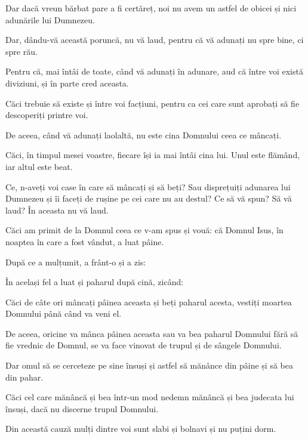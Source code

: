 {Dar dacă vreun bărbat pare a fi certăreț, noi nu avem un astfel de obicei și nici adunările lui Dumnezeu.


\par }{\PP {}Dar, dându-vă această poruncă, nu vă laud, pentru că vă adunați nu spre bine, ci spre rău.

Pentru că, mai întâi de toate, când vă adunați în adunare, aud că între voi există diviziuni, și în parte cred aceasta.

Căci trebuie să existe și între voi facțiuni, pentru ca cei care sunt aprobați să fie descoperiți printre voi.

De aceea, când vă adunați laolaltă, nu este cina Domnului ceea ce mâncați.

Căci, în timpul mesei voastre, fiecare își ia mai întâi cina lui. Unul este flămând, iar altul este beat.

Ce, n-aveți voi case în care să mâncați și să beți? Sau disprețuiți adunarea lui Dumnezeu și îi faceți de rușine pe cei care nu au destul? Ce să vă spun? Să vă laud? În aceasta nu vă laud.


\par }{\PP {}Căci am primit de la Domnul ceea ce v-am spus și vouă: că Domnul Isus, în noaptea în care a fost vândut, a luat pâine.

După ce a mulțumit, a frânt-o și a zis:
{}

În același fel a luat și paharul după cină, zicând:
{}

Căci de câte ori mâncați pâinea aceasta și beți paharul acesta, vestiți moartea Domnului până când va veni el.


\par }{\PP {}De aceea, oricine va mânca pâinea aceasta sau va bea paharul Domnului fără să fie vrednic de Domnul, se va face vinovat de trupul și de sângele Domnului.

Dar omul să se cerceteze pe sine însuși și astfel să mănânce din pâine și să bea din pahar.

Căci cel care mănâncă și bea într-un mod nedemn mănâncă și bea judecata lui însuși, dacă nu discerne trupul Domnului.

Din această cauză mulți dintre voi sunt slabi și bolnavi și nu puțini dorm.

}
